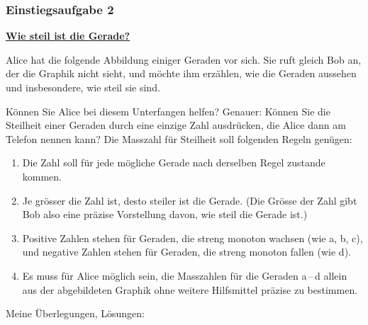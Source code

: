 \subsubsection*{Einstiegsaufgabe 2}
\begin{mdframed}[linewidth=1pt, innerleftmargin=10pt, innerrightmargin=10pt, innertopmargin=10pt, innerbottommargin=10pt]
    \textbf{\underline{Wie steil ist die Gerade?}}

    \medskip
    Alice hat die folgende Abbildung einiger Geraden vor sich. Sie ruft gleich Bob an, der die Graphik nicht sieht, und möchte ihm erzählen, wie die Geraden aussehen und insbesondere, wie steil sie sind.
    \begin{center}
    \end{center} 
    \begin{center} 
    \end{center}
    Können Sie Alice bei diesem Unterfangen helfen? Genauer: Können Sie die Steilheit einer Geraden durch eine einzige Zahl ausdrücken, die Alice dann am Telefon nennen kann? Die Masszahl für Steilheit soll folgenden Regeln genügen:
    \begin{enumerate}
        \item Die Zahl soll für jede mögliche Gerade nach derselben Regel zustande kommen.
        \item Je grösser die Zahl ist, desto steiler ist die Gerade. (Die Grösse der Zahl gibt Bob also eine präzise Vorstellung davon, wie steil die Gerade ist.)
        \item Positive Zahlen stehen für Geraden, die streng monoton wachsen (wie a, b, c), und negative Zahlen stehen für Geraden, die streng monoton fallen (wie d).
        \item Es muss für Alice möglich sein, die Masszahlen für die Geraden a\,--\,d allein aus der abgebildeten Graphik ohne weitere Hilfsmittel präzise zu bestimmen.
    \end{enumerate}
\end{mdframed}
\medskip
Meine Überlegungen, Lösungen:
\newpage

